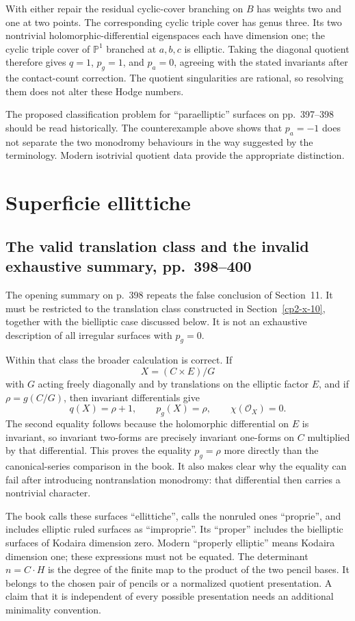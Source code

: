 With either repair the residual cyclic-cover branching on $B$ has weights two and one at two points. The corresponding cyclic triple cover has genus three. Its two nontrivial holomorphic-differential eigenspaces each have dimension one; the cyclic triple cover of $\mathbb P^1$ branched at $a,b,c$ is elliptic. Taking the diagonal quotient therefore gives $q=1$, $p_g=1$, and $p_a=0$, agreeing with the stated invariants after the contact-count correction. The quotient singularities are rational, so resolving them does not alter these Hodge numbers.

The proposed classification problem for ``paraelliptic'' surfaces on pp.~397--398 should be read historically. The counterexample above shows that $p_a=-1$ does not separate the two monodromy behaviours in the way suggested by the terminology. Modern isotrivial quotient data provide the appropriate distinction.

\section{Superficie ellittiche}
\label{cp2-x-12}

\subsection{The valid translation class and the invalid exhaustive summary, pp.~398--400}

The opening summary on p.~398 repeats the false conclusion of Section~11. It must be restricted to the translation class constructed in Section~\ref{cp2-x-10}, together with the bielliptic case discussed below. It is not an exhaustive description of all irregular surfaces with $p_g=0$.

Within that class the broader calculation is correct. If
\[
 X=(C\times E)/G
\]
with $G$ acting freely diagonally and by translations on the elliptic factor $E$, and if $\rho=g(C/G)$, then invariant differentials give
\[
 q(X)=\rho+1,\qquad
 p_g(X)=\rho,\qquad
 \chi(\mathcal O_X)=0.
\]
The second equality follows because the holomorphic differential on $E$ is invariant, so invariant two-forms are precisely invariant one-forms on $C$ multiplied by that differential. This proves the equality $p_g=\rho$ more directly than the canonical-series comparison in the book. It also makes clear why the equality can fail after introducing nontranslation monodromy: that differential then carries a nontrivial character.

The book calls these surfaces ``ellittiche'', calls the nonruled ones ``proprie'', and includes elliptic ruled surfaces as ``improprie''. Its ``proper'' includes the bielliptic surfaces of Kodaira dimension zero. Modern ``properly elliptic'' means Kodaira dimension one; these expressions must not be equated. The determinant $n=C\cdot H$ is the degree of the finite map to the product of the two pencil bases. It belongs to the chosen pair of pencils or a normalized quotient presentation. A claim that it is independent of every possible presentation needs an additional minimality convention.

